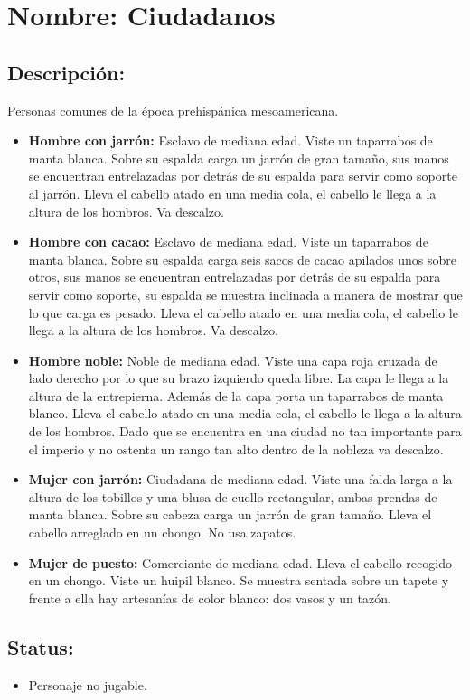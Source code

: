 \section{Nombre: Ciudadanos} \label{per:ciudadanos}  
\subsection{Descripción:}
Personas comunes de la época prehispánica mesoamericana.
\begin{itemize}
	\item \textbf{Hombre con jarrón:}
	Esclavo de mediana  edad. Viste un taparrabos de manta blanca. Sobre su espalda carga un jarrón de gran tamaño, sus manos se encuentran entrelazadas por detrás de su espalda para servir como soporte al jarrón. Lleva el cabello atado en una media cola, el cabello le llega a la altura de los hombros. Va descalzo.
	\item \textbf{Hombre con cacao:}
	Esclavo de mediana edad. Viste un taparrabos de manta blanca. Sobre su espalda carga seis sacos de cacao apilados unos sobre otros, sus manos se encuentran entrelazadas por detrás de su espalda para servir como soporte, su espalda se muestra inclinada a manera de mostrar que lo que carga es pesado. Lleva el cabello atado en una media cola, el cabello le llega a la altura de los hombros. Va descalzo.	
\item \textbf{Hombre noble:}
	Noble de mediana edad. Viste una capa roja cruzada de lado derecho por lo que su brazo izquierdo queda libre. La capa le llega a la altura de la entrepierna. Además de la capa porta un taparrabos de manta blanco. Lleva el cabello atado en una media cola, el cabello le llega a la altura de los hombros. Dado que se encuentra en una ciudad no tan importante para el imperio y no ostenta un rango tan alto dentro de la nobleza va descalzo.
	\item \textbf{Mujer con jarrón:}
	Ciudadana de mediana edad. Viste una falda larga a la altura de los tobillos y una blusa de cuello rectangular, ambas prendas de manta blanca. Sobre su cabeza carga un jarrón de gran tamaño. Lleva el cabello arreglado en un chongo. No usa zapatos.
	\item \textbf{Mujer de puesto:}
	Comerciante de mediana edad. Lleva el cabello recogido en un chongo. Viste un huipil blanco. Se muestra sentada sobre  un tapete y frente a ella hay artesanías de color blanco: dos vasos y un tazón.	
	\end{itemize} 
\subsection{Status:}
\begin{itemize}
		\item Personaje no jugable.
	\end{itemize}
